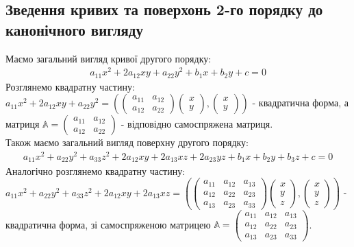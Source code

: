 \documentclass[a4paper, 10pt]{article}
\theoremstyle{theoremdd}
\begin{document}
\subsection{Зведення кривих та поверхонь 2-го порядку до канонічного вигляду}
Маємо загальний вигляд кривої другого порядку:
\begin{align*}
a_{11}x^2 + 2a_{12}xy + a_{22}y^2 + b_1x + b_2y + c = 0
\end{align*}
Розглянемо квадратну частину:\\
$a_{11}x^2 + 2a_{12}xy + a_{22}y^2 = \left( \begin{pmatrix}
 a_{11} & a_{12} \\
 a_{12} & a_{22}
\end{pmatrix} \begin{pmatrix}
x \\ y
\end{pmatrix}, \begin{pmatrix}
x \\ y
\end{pmatrix} \right)$ - квадратична форма, а матриця $\mathbb{A} = \begin{pmatrix}
a_{11} & a_{12} \\
a_{12} & a_{22}
\end{pmatrix}$ - відповідно самоспряжена матриця.
\bigskip \\
Також маємо загальний вигляд поверхну другого порядку:
\begin{align*}
a_{11}x^2 + a_{22}y^2 + a_{33}z^2 + 2a_{12}xy + 2a_{13}xz + 2a_{23}yz + b_1x + b_2y + b_3z + c = 0
\end{align*}
Аналогічно розглянемо квадратну частину:\\
$a_{11}x^2 + a_{22}y^2 + a_{33}z^2 + 2a_{12}xy + 2a_{13}xz = \left(\begin{pmatrix}
a_{11} & a_{12} & a_{13} \\
a_{12} & a_{22} & a_{23} \\
a_{13} & a_{23} & a_{33}
\end{pmatrix} \begin{pmatrix}
x \\ y \\ z
\end{pmatrix}, \begin{pmatrix}
x \\ y \\ z
\end{pmatrix} \right)$ - квадратична форма, зі самоспряженою матрицею $\mathbb{A} = \begin{pmatrix}
a_{11} & a_{12} & a_{13} \\
a_{12} & a_{22} & a_{23} \\
a_{13} & a_{23} & a_{33}
\end{pmatrix}$.
\end{document}
